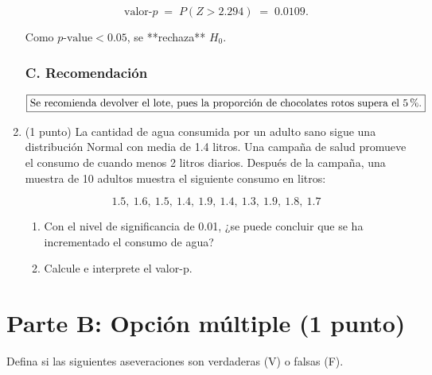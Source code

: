 \documentclass[12pt]{article}
\begin{document}
\begin{enumerate}
	      \[
		      \text{valor-}p \;=\; P(Z>2.294)\;=\;0.0109.
	      \]

	      Como \(p\text{-value} < 0.05\), se **rechaza** \(H_0\).

	      \subsubsection*{C. Recomendación}

	      \[
		      \boxed{\text{Se recomienda devolver el lote, pues la proporción
				      de chocolates rotos supera el 5\,\%.}}
	      \]

	      \endgroup

	\item (1 punto) La cantidad de agua consumida por un adulto sano sigue una distribución Normal con media de 1.4 litros. Una campaña de salud promueve el consumo de cuando menos 2 litros diarios. Después de la campaña, una muestra de 10 adultos muestra el siguiente consumo en litros:

	      \[
		      1.5,\ 1.6,\ 1.5,\ 1.4,\ 1.9,\ 1.4,\ 1.3,\ 1.9,\ 1.8,\ 1.7
	      \]

	      \begin{enumerate}
		      \item Con el nivel de significancia de 0.01, ¿se puede concluir que se ha
		            incrementado el consumo de agua?
		      \item Calcule e interprete el valor-p.
	      \end{enumerate}
\end{enumerate}

\section*{Parte B: Opción múltiple (1 punto)}

Defina si las siguientes aseveraciones son verdaderas (V) o falsas (F).
\end{document}
